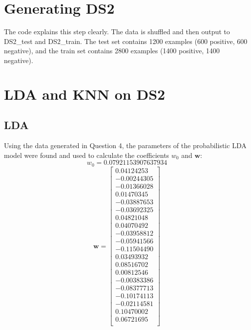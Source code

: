 \documentclass{article}
\begin{document}
\section{Generating DS2}
The code explains this step clearly. The data is shuffled and then output to DS2\_test and DS2\_train. The test set contains 1200 examples (600 positive, 600 negative), and the train set contains 2800 examples (1400 positive, 1400 negative).

\section{LDA and KNN on DS2}
\subsection{LDA}
Using the data generated in Question 4, the parameters of the probabilistic LDA model were found and used to calculate the coefficients \(w_0\) and \(\mathbf{w}\):\\

\[w_0 = 0.07921153907637934\]
\begin{equation}
    \mathbf{w}=
    \begin{bmatrix}
         0.04124253 \\
        -0.00244305 \\
        -0.01366028 \\
         0.01470345 \\
        -0.03887653 \\
        -0.03692325 \\
         0.04821048 \\
         0.04070492 \\
        -0.03958812 \\
        -0.05941566 \\
        -0.11504490 \\
         0.03493932 \\
         0.08516702 \\
         0.00812546 \\
        -0.00383386 \\
        -0.08377713 \\
        -0.10174113 \\
        -0.02114581 \\
         0.10470002 \\
         0.06721695 \\
    \end{bmatrix}
\end{equation}
\end{document}
